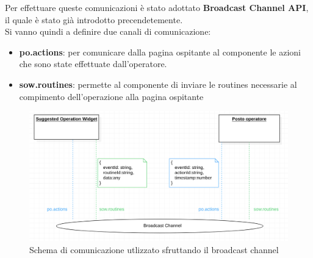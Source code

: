 Per effettuare queste comunicazioni è stato adottato \textbf{Broadcast Channel API}, il quale è stato già introdotto precendetemente.
\\
Si vanno quindi a definire due canali di comunicazione:
\begin{itemize}
    \item \textbf{po.actions}: per comunicare dalla pagina ospitante al componente le azioni che sono state effettuate dall'operatore.
    \item \textbf{sow.routines}: permette al componente di inviare le routines necessarie al compimento dell'operazione alla pagina ospitante
\end{itemize}
\begin{figure}[H]
    \centering
    \includegraphics[width=140mm]{img/broadcast_channel}
    \caption{Schema di comunicazione utlizzato sfruttando il broadcast channel}
  \end{figure}


\pagebreak
